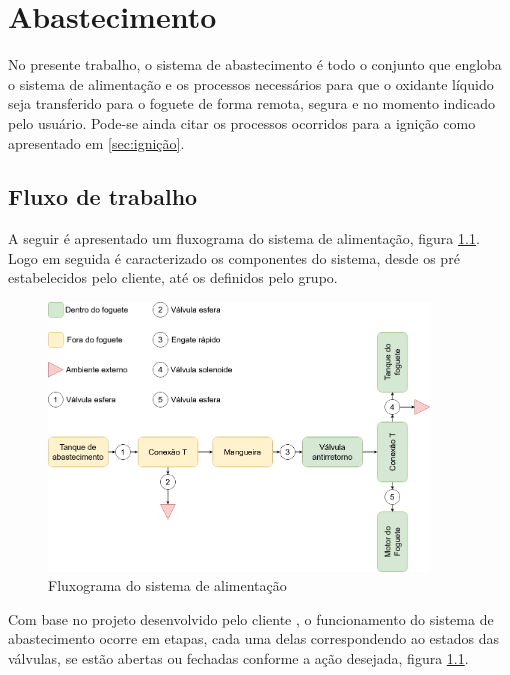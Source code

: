 \chapter{Abastecimento}
\label{abastecimento}

\par No presente trabalho, o sistema de abastecimento é todo o conjunto que engloba o sistema de alimentação e os processos necessários para que o oxidante líquido seja transferido para o foguete de forma remota, segura e no momento indicado pelo usuário. Pode-se ainda citar os processos ocorridos para a ignição como apresentado em \ref{sec:ignição}. 

\section{Fluxo de trabalho}

\par A seguir é apresentado um fluxograma do sistema de alimentação, figura \ref{fig:sistema de alimentacao}. Logo em seguida é caracterizado os componentes do sistema, desde os pré estabelecidos pelo cliente, até os definidos pelo grupo.

\begin{figure}[H]
\centering
\includegraphics[width=0.9\textwidth]{figuras/diagramaAlimentacao}
\caption{Fluxograma do sistema de alimentação}
\label{fig:sistema de alimentacao}
\end{figure}


\par Com base no projeto desenvolvido pelo cliente \cite{capitalrocketteam2020}, o funcionamento do sistema de abastecimento ocorre em etapas, cada uma delas correspondendo ao estados das válvulas, se estão abertas ou fechadas conforme a ação desejada, figura \ref{fig:sistema de alimentacao}. 

